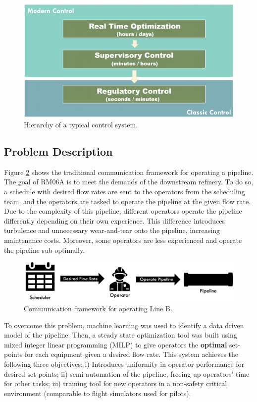 \begin{figure}[h]
    \centering
    \includegraphics[scale=0.25]{images/suncor/08APC.png}
    \caption{Hierarchy of a typical control system.}
    \label{fig:08APC}
\end{figure}

\subsection{Problem Description}
Figure \ref{fig:08schedule} shows the traditional communication framework for operating a pipeline. The goal of RM06A is to meet the demands of the downstream refinery. To do so, a schedule with desired flow rates are sent to the operators from the scheduling team, and the operators are tasked to operate the pipeline at the given flow rate. Due to the complexity of this pipeline, different operators operate the pipeline differently depending on their own experience.  This difference introduces turbulence and unnecessary wear-and-tear onto the pipeline, increasing maintenance costs. Moreover, some operators are less experienced and operate the pipeline sub-optimally.

\begin{figure}[h]
    \centering
    \includegraphics[scale=0.35]{images/suncor/08Schedule.png}
    \caption{Communication framework for operating Line B.}
    \label{fig:08schedule}
\end{figure}

To overcome this problem, machine learning was used to identify a data driven model of the pipeline.  Then, a steady state optimization tool was built using mixed integer linear programming (MILP) to give operators the \textbf{optimal} set-points for each equipment given a desired flow rate.  This system achieves the following three objectives: i) Introduces uniformity in operator performance for desired set-points; ii) semi-automation of the pipeline, freeing up operators' time for other tasks; iii) training tool for new operators in a non-safety critical environment (comparable to flight simulators used for pilots).

